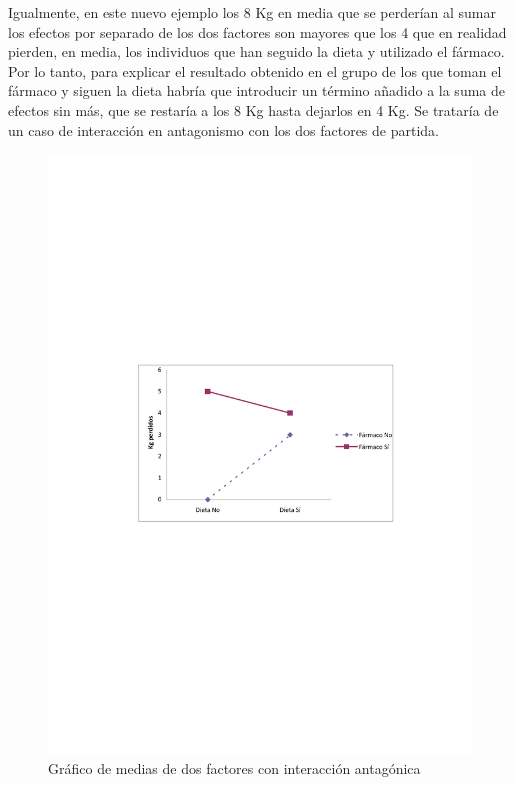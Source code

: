\documentclass[
  a4paper,
]{scrreport}
\theoremstyle{plain}
\theoremstyle{definition}
\theoremstyle{definition}
\theoremstyle{remark}
\begin{document}
Igualmente, en este nuevo ejemplo los 8 Kg en media que se perderían al
sumar los efectos por separado de los dos factores son mayores que los 4
que en realidad pierden, en media, los individuos que han seguido la
dieta y utilizado el fármaco. Por lo tanto, para explicar el resultado
obtenido en el grupo de los que toman el fármaco y siguen la dieta
habría que introducir un término añadido a la suma de efectos sin más,
que se restaría a los 8 Kg hasta dejarlos en 4 Kg. Se trataría de un
caso de interacción en antagonismo con los dos factores de partida.

\begin{figure}[H]

{\centering \includegraphics{img/anova-ancova/coninteraccion2.pdf}

}

\caption{Gráfico de medias de dos factores con interacción antagónica}

\end{figure}%
\end{document}

